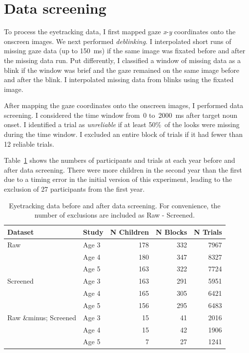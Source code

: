 \documentclass [11pt, proquest] {uwthesis}[2015/03/03]
\begin{document}
\section{Data screening}\label{data-screening}

To process the eyetracking data, I first mapped gaze \emph{x}-\emph{y}
coordinates onto the onscreen images. We next performed
\emph{deblinking}. I interpolated short runs of missing gaze data (up to
150~ms) if the same image was fixated before and after the missing data
run. Put differently, I classified a window of missing data as a blink
if the window was brief and the gaze remained on the same image before
and after the blink. I interpolated missing data from blinks using the
fixated image.

After mapping the gaze coordinates onto the onscreen images, I performed
data screening. I considered the time window from~0 to~2000~ms after
target noun onset. I identified a trial as \emph{unreliable} if at least
50\%~of the looks were missing during the time window. I excluded an
entire block of trials if it had fewer than 12 reliable trials.

Table~\ref{tab:screening-counts} shows the numbers of participants and
trials at each year before and after data screening. There were more
children in the second year than the first due to a timing error in the
initial version of this experiment, leading to the exclusion of 27
participants from the first year.
\begin{table}

\caption{\label{tab:screening-counts}Eyetracking data before and after data screening. For convenience, the number of exclusions are included as Raw - Screened.}
\centering
\begin{tabular}[t]{llrrr}
\toprule
Dataset & Study & N Children & N Blocks & N Trials\\
\midrule
Raw & Age 3 & 178 & 332 & 7967\\
 & Age 4 & 180 & 347 & 8327\\
 & Age 5 & 163 & 322 & 7724\\
Screened & Age 3 & 163 & 291 & 5951\\
 & Age 4 & 165 & 305 & 6421\\
\addlinespace
 & Age 5 & 156 & 295 & 6483\\
Raw \&minus; Screened & Age 3 & 15 & 41 & 2016\\
 & Age 4 & 15 & 42 & 1906\\
 & Age 5 & 7 & 27 & 1241\\
\bottomrule
\end{tabular}
\end{table}
\end{document}
